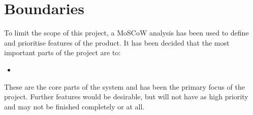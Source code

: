 
\chapter{Boundaries}
\label{sec:Boundaries}
To limit the scope of this project, a MoSCoW\cite{moscow} analysis has been used to define and prioritise features of the product.
It has been decided that the most important parts of the project are to:

\begin{itemize}
	\item 
\end{itemize}
These are the core parts of the system and has been the primary focus of the project. 
Further features would be desirable, but will not have as high priority and may not be finished completely or at all.
